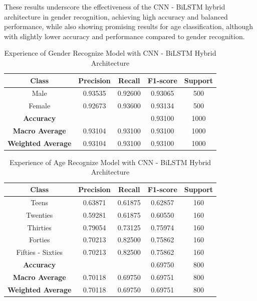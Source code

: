 \documentclass[conference, 10pt,onecolumn]{IEEEtran}
\begin{document}
These results underscore the effectiveness of the CNN - BiLSTM hybrid architecture in gender recognition, achieving high accuracy and balanced performance, while also showing promising results for age classification, although with slightly lower accuracy and performance compared to gender recognition.
\begin{table}[htbp]
    \centering
    \begin{tabular}{|c|cccc|}
        \hline
        \textbf{Class} & \textbf{Precision} & \textbf{Recall} & \textbf{F1-score} & \textbf{Support} \\
        \hline
        Male & 0.93535 & 0.92600 & 0.93065 & 500 \\
        Female & 0.92673 & 0.93600 & 0.93134 & 500 \\
        \hline
        \textbf{Accuracy} & \multicolumn{2}{c}{} & 0.93100 & 1000 \\
        \textbf{Macro Average} & 0.93104 & 0.93100 & 0.93100 & 1000 \\
        \textbf{Weighted Average} & 0.93104 & 0.93100 & 0.93100 & 1000 \\
        \hline
    \end{tabular}
    \caption{Experience of Gender Recognize Model with CNN - BiLSTM Hybrid Architecture}
    \label{tab:Experience of Gender Recognize Model with CNN - BiLSTM Hybrid Architecture}
\end{table}

\begin{table}[htbp]
    \centering
    \begin{tabular}{|c|cccc|}
        \hline
        \textbf{Class} & \textbf{Precision} & \textbf{Recall} & \textbf{F1-score} & \textbf{Support} \\
        \hline
        Teens & 0.63871 & 0.61875 & 0.62857 & 160 \\
        Twenties & 0.59281 & 0.61875 & 0.60550 & 160 \\
        Thirties &  0.79054 & 0.73125 & 0.75974 & 160 \\
        Forties &   0.70213 & 0.82500 & 0.75862 & 160 \\
        Fifties - Sixties & 0.70213 & 0.82500 & 0.75862 & 160 \\
        \hline
        \textbf{Accuracy} &  &  & 0.69750 & 800 \\
        \textbf{Macro Average} & 0.70118 & 0.69750 & 0.69751 & 800 \\
        \textbf{Weighted Average} & 0.70118 & 0.69750 & 0.69751 & 800 \\
        \hline
    \end{tabular}
    \caption{Experience of Age Recognize Model with CNN - BiLSTM Hybrid Architecture}
    \label{tab:Experience of Age Recognize Model with CNN - BiLSTM Hybrid Architecture}
\end{table}
\end{document}
